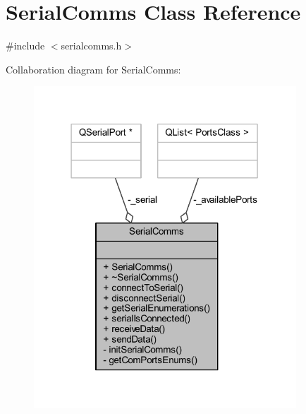 \hypertarget{classSerialComms}{}\section{Serial\+Comms Class Reference}
\label{classSerialComms}


{\ttfamily \#include $<$serialcomms.\+h$>$}



Collaboration diagram for Serial\+Comms\+:
\nopagebreak
\begin{figure}[H]
\begin{center}
\leavevmode
\includegraphics[width=279pt]{classSerialComms__coll__graph}
\end{center}
\end{figure}
